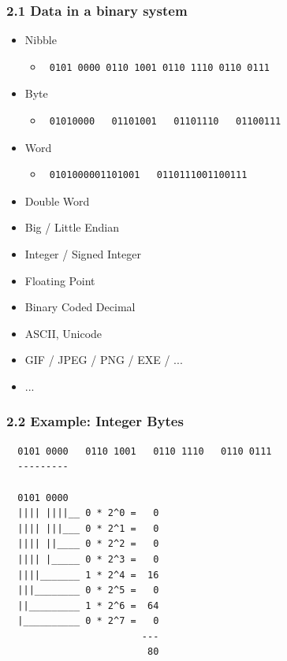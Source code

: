 \begin{frame}[fragile]
  \frametitle{2.1 Data in a binary system}
    \begin{itemize}
        \item Nibble
            \begin{itemize}
                \item[] \begin{verbatim} 0101 0000 0110 1001 0110 1110 0110 0111 \end{verbatim}
            \end{itemize}
        \item Byte
            \begin{itemize}
                \item[] \begin{verbatim} 01010000   01101001   01101110   01100111 \end{verbatim}
            \end{itemize}
        \item Word
            \begin{itemize}
                \item[] \begin{verbatim} 0101000001101001   0110111001100111 \end{verbatim}
            \end{itemize}
        \item Double Word
        \item Big / Little Endian
        \item Integer / Signed Integer
        \item Floating Point
        \item Binary Coded Decimal
        \item ASCII, Unicode 
        \item GIF / JPEG / PNG / EXE / ...
        \item ...
    \end{itemize}
\end{frame}


\begin{frame}[fragile]
  \frametitle{2.2 Example: Integer Bytes}
  \begin{verbatim}
  0101 0000   0110 1001   0110 1110   0110 0111
  ---------

  0101 0000
  |||| ||||__ 0 * 2^0 =   0
  |||| |||___ 0 * 2^1 =   0
  |||| ||____ 0 * 2^2 =   0
  |||| |_____ 0 * 2^3 =   0
  ||||_______ 1 * 2^4 =  16
  |||________ 0 * 2^5 =   0
  ||_________ 1 * 2^6 =  64
  |__________ 0 * 2^7 =   0
                        ---
                         80
  \end{verbatim}
\end{frame}


